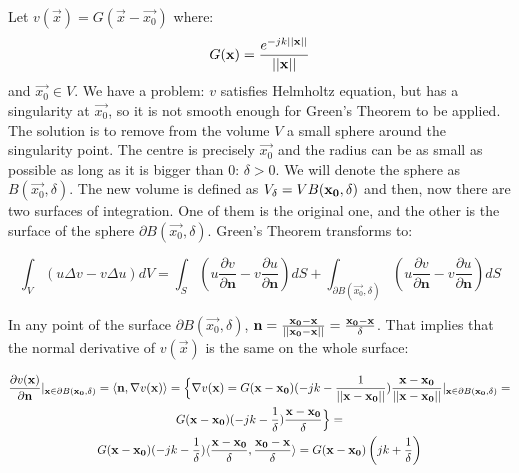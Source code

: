 Let $v(\vec{x}) = G(\vec{x} - \vec{x_0})$ where:
\begin{equation}
G(\vec{x}) = \frac{e^{-j k \norm{\vec{x}} }}{\norm{\vec{x}}}
\label{eqGreensFunction}
\end{equation}
and $\vec{x_0} \in V$.
We have a problem: $v$ satisfies Helmholtz equation, but has a singularity at $\vec{x_0}$, so it is not smooth enough for Green's Theorem to be applied. The solution is to remove from the volume $V$ a small sphere around the singularity point. The centre is precisely $\vec{x_0}$ and the radius can be as small as possible as long as it is bigger than 0: $\delta > 0$. We will denote the sphere as $B(\vec{x_0}, \delta)$. The new volume is defined as $V_{\delta} = V \\ B(\vec{x_0}, \delta)$ and then, now there are two surfaces of integration. One of them is the original one, and the other is the surface of the sphere $\partial B(\vec{x_0}, \delta)$. Green's Theorem transforms to:

\begin{equation}
 \int_{V} \left( u \Delta v - v \Delta u \right) dV = \int_{S} \left(u\frac{\partial v}{\partial \mathbf{n}} - v \frac{\partial u}{\partial \mathbf{n}}\right) dS + \int_{\partial B(\vec{x_0}, \delta)} \left(u\frac{\partial v}{\partial \mathbf{n}} - v \frac{\partial u}{\partial \mathbf{n}}\right) dS
\end{equation}

In any point of the surface $\partial B(\vec{x_0}, \delta)$, $\vec{n} = \frac{\vec{x_0} - \vec{x}}{\norm{\vec{x_0} - \vec{x}}} = \frac{\vec{x_0} - \vec{x}}{\delta}$. That implies that the normal derivative of $v(\vec{x})$ is the same on the whole surface:

\begin{multline}
\frac{\partial v(\vec{x})}{\partial \vec{n}} \rvert_{\vec{x} \in \partial B(\vec{x_0}, \delta)} = \langle \vec{n} , \nabla v(\vec{x}) \rangle =
\Big\{ \nabla v(\vec{x}) = G(\vec{x} - \vec{x_0})(-jk - \frac{1}{\norm{\vec{x} - \vec{x_0}}})\frac{\vec{x} - \vec{x_0}}{\norm{\vec{x} - \vec{x_0}}}|_{\vec{x} \in \partial B(\vec{x_0}, \delta)}= \\
G(\vec{x} - \vec{x_0})(-jk - \frac{1}{\delta})\frac{\vec{x} - \vec{x_0}}{\delta} \Big\} = \\ G(\vec{x} - \vec{x_0})(-jk - \frac{1}{\delta})\langle \frac{\vec{x} - \vec{x_0}}{\delta} , \frac{\vec{x_0} - \vec{x}}{\delta} \rangle = G(\vec{x} - \vec{x_0})\left( jk + \frac{1}{\delta} \right)
\end{multline}

